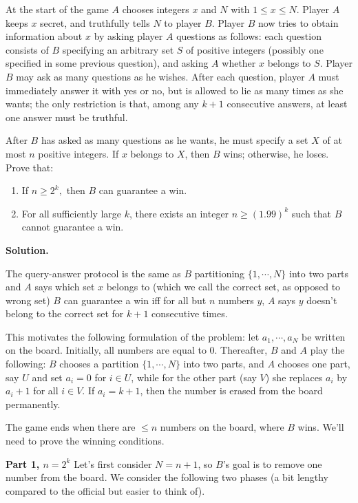 \documentclass[11pt,a4paper]{article}
\begin{document}
\begin{enumerate}
		At the start of the game $A$ chooses integers $x$ and $N$ with $1 \le x \le N.$ Player $A$ keeps $x$ secret, and truthfully tells $N$ to player $B$. Player $B$ now tries to obtain information about $x$ by asking player $A$ questions as follows: each question consists of $B$ specifying an arbitrary set $S$ of positive integers (possibly one specified in some previous question), and asking $A$ whether $x$ belongs to $S$. Player $B$ may ask as many questions as he wishes. After each question, player $A$ must immediately answer it with yes or no, but is allowed to lie as many times as she wants; the only restriction is that, among any $k+1$ consecutive answers, at least one answer must be truthful.
		
		After $B$ has asked as many questions as he wants, he must specify a set $X$ of at most $n$ positive integers. If $x$ belongs to $X$, then $B$ wins; otherwise, he loses. Prove that:
		\begin{enumerate}
			\item 
			If $n \ge 2^k,$ then $B$ can guarantee a win.
			
			\item For all sufficiently large $k$, there exists an integer $n \ge (1.99)^k$ such that $B$ cannot guarantee a win.
		\end{enumerate}
		
		\textbf{Solution.} 
		
		The query-answer protocol is the same as $B$ partitioning $\{1, \cdots, N\}$ into two parts and $A$ says which set $x$ belongs to (which we call the correct set, as opposed to wrong set)
		$B$ can guarantee a win iff for all but $n$ numbers $y$, $A$ says $y$ doesn't belong to the correct set for $k+1$ consecutive times. 
		
		This motivates the following formulation of the problem: 
		let $a_1, \cdots, a_N$ be written on the board. 
		Initially, all numbers are equal to 0. 
		Thereafter, $B$ and $A$ play the following: 
		$B$ chooses a partition $\{1, \cdots, N\}$ into two parts, 
		and $A$ chooses one part, say $U$ and set $a_i=0$ for $i\in U$, 
		while for the other part (say $V$) she replaces $a_i$ by $a_i+1$ for all $i\in V$. 
		If $a_i=k+1$, then the number is erased from the board permanently. 
		
		The game ends when there are $\le n$ numbers on the board, where $B$ wins. 
		We'll need to prove the winning conditions. 
		
		\textbf{Part 1, $n=2^k$} Let's first consider $N = n + 1$, so $B$'s goal is to remove one number from the board. 
		We consider the following two phases (a bit lengthy compared to the official but easier to think of). 
		

\end{enumerate}
\end{document}
